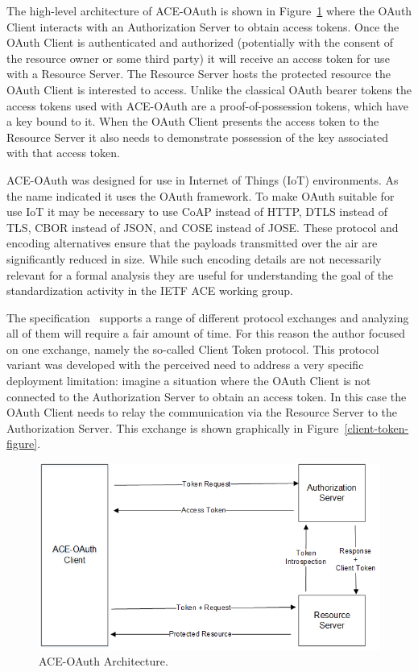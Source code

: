 \documentclass[peerreview, a4paper, 7pt]{IEEEtran}
\begin{document}
The high-level architecture of ACE-OAuth is shown in Figure~\ref{ace-oauth-architecture-figure} where the OAuth Client interacts with an Authorization Server to obtain access tokens. Once the OAuth Client is authenticated and authorized (potentially with the consent of the resource owner or some third party) it will receive an access token for use with a Resource Server. The Resource Server hosts the protected resource the OAuth Client is interested to access. Unlike the classical OAuth bearer tokens the access tokens used with ACE-OAuth are a proof-of-possession tokens, which have a key bound to it. When the OAuth Client presents the access token to the Resource Server it also needs to demonstrate possession of the key associated with that access token. 

ACE-OAuth was designed for use in Internet of Things (IoT) environments. As the name indicated it uses the OAuth framework. To make OAuth suitable for use IoT it may be necessary to use CoAP instead of HTTP, DTLS instead of TLS, CBOR instead of JSON, and COSE instead of JOSE. These protocol and encoding alternatives ensure that the payloads transmitted over the air are significantly reduced in size. While such encoding details are not necessarily relevant for a formal analysis they are useful for understanding the goal of the standardization activity in the IETF ACE working group.  

The specification~\cite{draft-ietf-ace-oauth-authz-09} supports a range of different protocol exchanges and analyzing all of them will require a fair amount of time. For this reason the author focused on one exchange, namely the so-called Client Token protocol. This protocol variant was developed with the perceived need to address a very specific deployment limitation: imagine a situation where the OAuth Client is not connected to the Authorization Server to obtain an access token. In this case the OAuth Client needs to relay the communication via the Resource Server to the Authorization Server. This exchange is shown graphically in Figure~\ref{client-token-figure}.

\begin{figure}[!htbp]
 \centering
 \includegraphics[scale=0.70]{ace-oauth-architecture.png}
 \caption{ACE-OAuth Architecture.}
 \label{ace-oauth-architecture-figure}
\end{figure}
\end{document}
